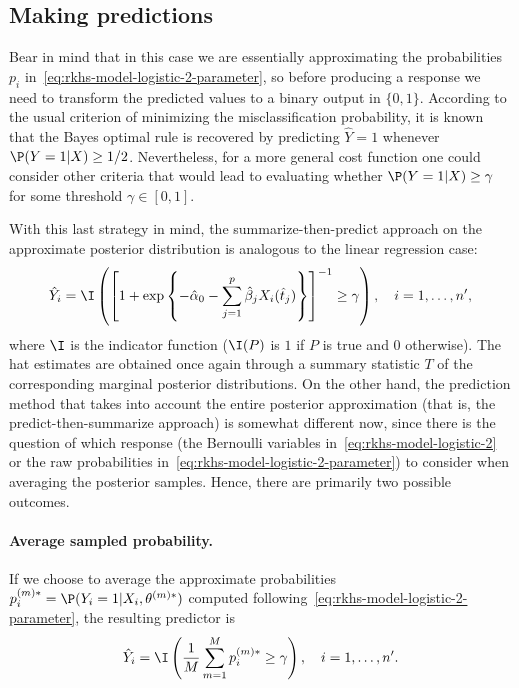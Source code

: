 \subsection*{Making predictions}

Bear in mind that in this case we are essentially approximating the probabilities \(p_i\) in~\eqref{eq:rkhs-model-logistic-2-parameter}, so before producing a response we need to transform the predicted values to a binary output in \(\{0, 1\}\). According to the usual criterion of minimizing the misclassification probability, it is known that the Bayes optimal rule is recovered by predicting \(\hat Y=1\) whenever \(\P(Y=1|X) \geq 1/2\). Nevertheless, for a more general cost function one could consider other criteria that would lead to evaluating whether \(\P(Y=1|X) \geq \gamma\) for some threshold \(\gamma\in[0, 1]\).

With this last strategy in mind, the summarize-then-predict approach on the approximate posterior distribution is analogous to the linear regression case:
\begin{equation}\label{eq:summarize-predict-logistic}
\hat Y_i = \I \left( \left[\displaystyle 1 + \exp\left\{-\hat\alpha_0 - \sum_{j=1}^p \hat\beta_j X_i(\hat t_j)\right\}\right]^{-1} \geq \gamma \right), \quad i=1,\dots,n',
\end{equation}
where \(\I\) is the indicator function (\(\I(P)\) is \(1\) if \(P\) is true and \(0\) otherwise). The hat estimates are obtained once again through a summary statistic \(T\) of the corresponding marginal posterior distributions. On the other hand, the prediction method that takes into account the entire posterior approximation (that is, the predict-then-summarize approach) is somewhat different now, since there is the question of which response (the Bernoulli variables in~\eqref{eq:rkhs-model-logistic-2} or the raw probabilities in~\eqref{eq:rkhs-model-logistic-2-parameter}) to consider when averaging the posterior samples. Hence, there are primarily two possible outcomes.

  \paragraph{Average sampled probability.} If we choose to average the approximate probabilities \(p_i^{(m)*} = \P(Y_i =1 | X_i,\theta^{(m)*})\) computed following~\eqref{eq:rkhs-model-logistic-2-parameter}, the resulting predictor is
  \[
    \hat Y_i = \I\left(\frac{1}{M} \sum_{m=1}^M p_i^{(m)*} \geq \gamma\right), \quad i=1,\dots,n'.
  \]
